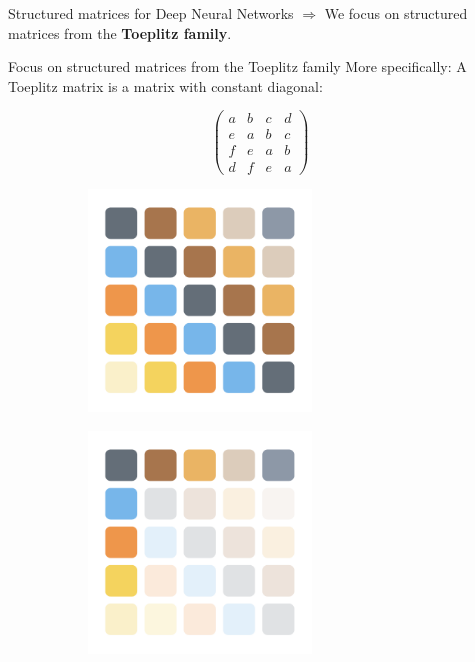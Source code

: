\begin{frame}{Structured matrices for Deep Neural Networks}
  $\Rightarrow$ We focus on structured matrices from the \textbf{Toeplitz family}. 

\end{frame}


\begin{frame}{Focus on structured matrices from the Toeplitz family}
  More specifically:
  A Toeplitz matrix is a matrix with constant diagonal:
  \begin{figure}
    \begin{subfigure}[b]{0.3\textwidth}
     \centering
     \begin{equation*}
	\begin{pmatrix}
	  a & b & c & d \\
	  e & a & b & c \\
	  f & e & a & b \\
	  d & f & e & a
	\end{pmatrix}
     \end{equation*}
     \caption*{}
    \end{subfigure}
    \hfill
    \begin{subfigure}[b]{0.3\textwidth}
      \centering
      \includegraphics[width=0.65\textwidth]{images/toeplitz_v1.pdf}
      \caption*{}
    \end{subfigure}
    \hfill
    \begin{subfigure}[b]{0.3\textwidth}
      \centering
      \includegraphics[width=0.65\textwidth]{images/toeplitz_v2.pdf}

\end{subfigure}
\end{figure}
\end{frame}
